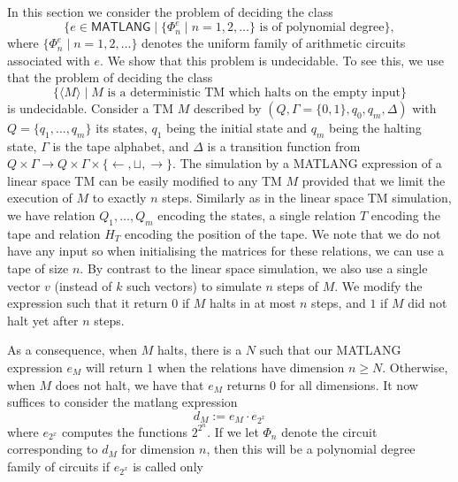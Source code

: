 
In this section we consider the problem of deciding the class
$$
\{ e\in \mathsf{MATLANG}\mid\text{$\{\Phi_n^e\mid n=1,2,\ldots\}$ is of polynomial degree}\},
$$
where $\{\Phi_n^e\mid n=1,2,\ldots\}$ denotes the uniform family of arithmetic circuits associated with $e$.
We show that this problem is undecidable. To see this, we use that the problem of deciding the class
$$
\{ \langle M\rangle\mid \text{$M$ is a deterministic TM which halts on the empty input}\}
$$
is undecidable. Consider a TM $M$ described by $(Q,\Gamma=\{0,1\},q_0,q_m,\Delta)$
with $Q=\{q_1,\ldots,q_m\}$ its states, $q_1$ being the initial state and $q_m$ being
the halting state, $\Gamma$ is the tape alphabet, and $\Delta$ is a transition function
from $Q\times \Gamma\to Q\times\Gamma\times \{\leftarrow,\sqcup,\rightarrow\}$. The 
simulation by a MATLANG expression of a linear space TM can be easily modified to
any TM $M$ provided that we limit the execution of $M$ to exactly $n$ steps. Similarly
as in the linear space TM simulation, we have relation $Q_1,\ldots,Q_m$ encoding the
states, a single relation $T$ encoding the tape and relation $H_T$ encoding the position
of the tape. We note that we do not have any input so when initialising the matrices
for these relations, we can use a tape of size $n$. By contrast to the linear space 
simulation, we also use a single vector $v$ (instead of $k$ such vectors) 
to simulate $n$ steps of $M$. We modify the expression such that it return $0$ if $M$
halts in at most $n$ steps, and $1$ if $M$ did not halt yet after $n$ steps.

As a consequence, when $M$ halts, there is a $N$ such that our MATLANG expression
$e_M$ will return $1$ when the relations have dimension $n\geq N$. Otherwise, when
$M$ does not halt, we have that $e_M$ returns $0$ for all dimensions. It now suffices
to consider the matlang expression
$$
d_M:=e_M\cdot e_{2^x}
$$
where $e_{2^x}$ computes the functions $2^{2^n}$. If we let 
$\Phi_n$ denote the circuit corresponding to $d_M$ for dimension $n$,
then this will be a polynomial degree family of circuits if 
 $e_{2^x}$ is called only



%
%
%
